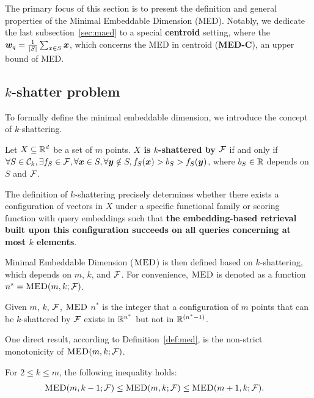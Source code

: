 The primary focus of this section is to present the definition and general properties of the Minimal Embeddable Dimension (MED). Notably, we dedicate the last subsection~\ref{sec:maed} to a special \textbf{centroid} setting, where the $\bm{w}_q = \frac{1}{|S|} \sum_{x\in S} \bm{x}$, which concerns the MED in centroid (\textbf{MED-C}), an upper bound of MED.

\subsection{$k$-shatter problem}
To formally define the minimal embeddable dimension, we introduce the concept of $k$-shattering.
\begin{definition}[$k$-shattering]
    Let $X\subseteq \mathbb{R}^d$ be a set of $m$ points. \textbf{$X$ is $k$-shattered by $\mathcal{F}$} if and only if  $\forall S\in \mathcal{C}_k,\exists f_S\in \mathcal{F},\forall \bm{x} \in S,\forall \bm{y}\notin S, f_S(\bm{x}) > b_S > f_S(\bm{y})$, where $b_S\in \mathbb{R}$ depends on $S$ and $\mathcal{F}$.
\end{definition}

\begin{remark}
    The definition of $k$-shattering precisely determines whether there exists a configuration of vectors in $X$ under a specific functional family or scoring function with query embeddings such that \textbf{the embedding-based retrieval built upon this configuration succeeds on all queries concerning at most $k$ elements}.
\end{remark}

Minimal Embeddable Dimension ($\textsc{MED}$) is then defined based on $k$-shattering, which depends on $m$, $k$, and $\mathcal{F}$. For convenience, $\textsc{MED}$ is denoted as a function $n^*=\textsc{MED}(m, k; \mathcal{F})$.
\begin{definition}\label{def:med}
    Given $m$, $k$, $\mathcal{F}$, $\textsc{MED}$ $n^*$ is the integer that a configuration of $m$ points that can be $k$-shattered by $\mathcal{F}$ exists in $\mathbb{R}^{n^*}$ but not in $\mathbb{R}^{(n^*-1)}$.
\end{definition}

One direct result, according to Definition~\ref{def:med}, is the non-strict monotonicity of $\textsc{MED}(m, k; \mathcal{F})$.
\begin{proposition}\label{prop:monotonic}
For $2\leq k\leq m$, the following inequality holds:
\begin{align*}
    \textsc{MED}(m, k-1;\mathcal{F}) &\leq \textsc{MED}(m, k; \mathcal{F}) \leq \textsc{MED}(m+1, k; \mathcal{F}).
\end{align*}
\end{proposition}

